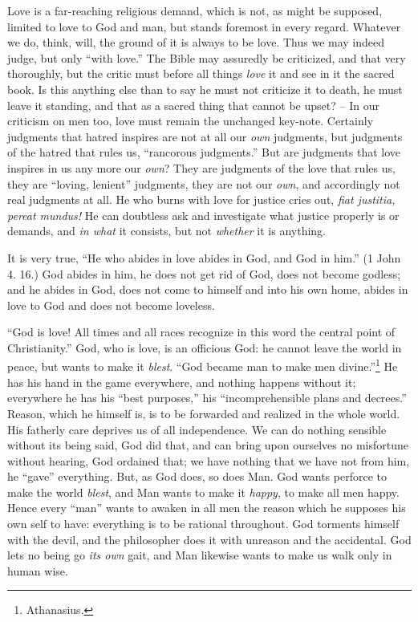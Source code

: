 Love is a far-reaching religious demand, which is not, as might be supposed, 
limited to love to God and man, but stands foremost in every regard. Whatever 
we do, think, will, the ground of it is always to be love. Thus we may indeed 
judge, but only ``with love.'' The Bible may assuredly be criticized, and 
that very thoroughly, but the critic must before all things \textit{love} it 
and see in it the sacred book. Is this anything else than to say he must not 
criticize it to death, he must leave it standing, and that as a sacred thing 
that cannot be upset? -- In our criticism on men too, love must remain the 
unchanged key-note. Certainly judgments that hatred inspires are not at all 
our \textit{own} judgments, but judgments of the hatred that rules us, 
``rancorous judgments.'' But are judgments that love inspires in us any more 
our \textit{own}? They are judgments of the love that rules us, they are 
``loving, lenient'' judgments, they are not our \textit{own}, and 
accordingly not real judgments at all. He who burns with love for justice 
cries out, \textit{fiat justitia, pereat mundus!} He can doubtless ask and 
investigate what justice properly is or demands, and \textit{in what} it 
consists, but not \textit{whether} it is anything.

It is very true, ``He who abides in love abides in God, and God in him.'' (1 
John 4. 16.) God abides in him, he does not get rid of God, does not become 
godless; and he abides in God, does not come to himself and into his own home, 
abides in love to God and does not become loveless.

``God is love! All times and all races recognize in this word the central 
point of Christianity.'' God, who is love, is an officious God: he cannot 
leave the world in peace, but wants to make it \textit{blest}. ``God became 
man to make men divine.''\footnote{Athanasius.} He has his hand in the game 
everywhere, and nothing happens without it; everywhere he has his ``best 
purposes,'' his ``incomprehensible plans and decrees.'' Reason, which he 
himself is, is to be forwarded and realized in the whole world. His fatherly 
care deprives us of all independence. We can do nothing sensible without its 
being said, God did that, and can bring upon ourselves no misfortune without 
hearing, God ordained that; we have nothing that we have not from him, he 
``gave'' everything. But, as God does, so does Man. God wants perforce to 
make the world \textit{blest}, and Man wants to make it \textit{happy}, to 
make all men happy. Hence every ``man'' wants to awaken in all men the 
reason which he supposes his own self to have: everything is to be rational 
throughout. God torments himself with the devil, and the philosopher does it 
with unreason and the accidental. God lets no being go \textit{its own} gait, 
and Man likewise wants to make us walk only in human wise.

